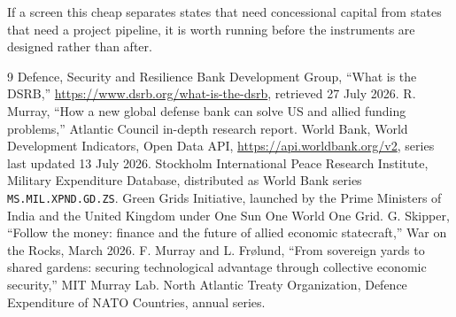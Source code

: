 \documentclass[10pt,twocolumn]{article}
\begin{document}
If a screen this cheap separates states that need concessional capital from states
that need a project pipeline, it is worth running before the instruments are
designed rather than after.

\begin{thebibliography}{9}\small
{} Defence, Security and Resilience Bank Development Group, ``What is
the DSRB,'' \url{https://www.dsrb.org/what-is-the-dsrb}, retrieved 27 July 2026.
 R. Murray, ``How a new global defense bank can solve US
and allied funding problems,'' Atlantic Council in-depth research report.
 World Bank, World Development Indicators, Open Data API,
\url{https://api.worldbank.org/v2}, series last updated 13 July 2026.
 Stockholm International Peace Research Institute, Military
Expenditure Database, distributed as World Bank series
\texttt{MS.MIL.XPND.GD.ZS}.
 Green Grids Initiative, launched by the Prime Ministers of India and
the United Kingdom under One Sun One World One Grid.
 G. Skipper, ``Follow the money: finance and the future of
allied economic statecraft,'' War on the Rocks, March 2026.
 F. Murray and L. Fr\o lund, ``From sovereign yards to
shared gardens: securing technological advantage through collective economic
security,'' MIT Murray Lab.
 North Atlantic Treaty Organization, Defence Expenditure of NATO
Countries, annual series.
\end{thebibliography}
\end{document}

